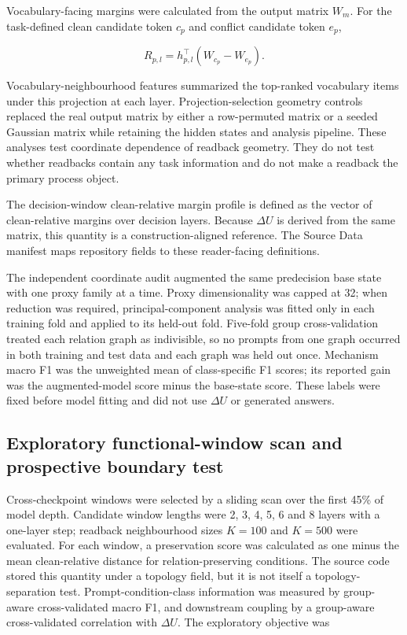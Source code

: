 \documentclass[12pt]{article}
\begin{document}
Vocabulary-facing margins were calculated from the output matrix \(W_m\). For the task-defined clean candidate token \(c_p\) and conflict candidate token \(e_p\),

\[
R_{p,l}=h_{p,l}^{\top}(W_{c_p}-W_{e_p}).
\]

Vocabulary-neighbourhood features summarized the top-ranked vocabulary items under this projection at each layer. Projection-selection geometry controls replaced the real output matrix by either a row-permuted matrix or a seeded Gaussian matrix while retaining the hidden states and analysis pipeline. These analyses test coordinate dependence of readback geometry. They do not test whether readbacks contain any task information and do not make a readback the primary process object.

The decision-window clean-relative margin profile is defined as the vector of clean-relative margins over decision layers. Because \(\Delta U\) is derived from the same matrix, this quantity is a construction-aligned reference. The Source Data manifest maps repository fields to these reader-facing definitions.

The independent coordinate audit augmented the same predecision base state with one proxy family at a time. Proxy dimensionality was capped at 32; when reduction was required, principal-component analysis was fitted only in each training fold and applied to its held-out fold. Five-fold group cross-validation treated each relation graph as indivisible, so no prompts from one graph occurred in both training and test data and each graph was held out once. Mechanism macro F1 was the unweighted mean of class-specific F1 scores; its reported gain was the augmented-model score minus the base-state score. These labels were fixed before model fitting and did not use \(\Delta U\) or generated answers.

\subsection*{Exploratory functional-window scan and prospective boundary test}

Cross-checkpoint windows were selected by a sliding scan over the first 45\% of model depth. Candidate window lengths were 2, 3, 4, 5, 6 and 8 layers with a one-layer step; readback neighbourhood sizes \(K=100\) and \(K=500\) were evaluated. For each window, a preservation score was calculated as one minus the mean clean-relative distance for relation-preserving conditions. The source code stored this quantity under a topology field, but it is not itself a topology-separation test. Prompt-condition-class information was measured by group-aware cross-validated macro F1, and downstream coupling by a group-aware cross-validated correlation with \(\Delta U\). The exploratory objective was
\end{document}
